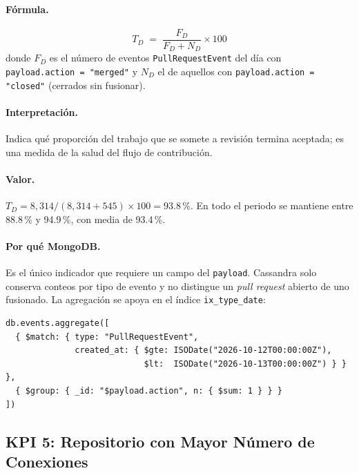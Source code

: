\paragraph{Fórmula.}
\[
T_D \;=\; \frac{F_D}{F_D + N_D} \times 100
\]
donde $F_D$ es el número de eventos \texttt{PullRequestEvent} del día con \texttt{payload.action = "merged"} y $N_D$ el de aquellos con \texttt{payload.action = "closed"} (cerrados sin fusionar).

\paragraph{Interpretación.} Indica qué proporción del trabajo que se somete a revisión termina aceptada; es una medida de la salud del flujo de contribución.

\paragraph{Valor.} $T_D = 8{,}314 / (8{,}314 + 545) \times 100 = 93.8$\,\%. En todo el periodo se mantiene entre 88.8\,\% y 94.9\,\%, con media de 93.4\,\%.

\paragraph{Por qué MongoDB.} Es el único indicador que requiere un campo del \texttt{payload}. Cassandra solo conserva conteos por tipo de evento y no distingue un \textit{pull request} abierto de uno fusionado. La agregación se apoya en el índice \texttt{ix\_type\_date}:

\begin{lstlisting}[style=plano]
db.events.aggregate([
  { $match: { type: "PullRequestEvent",
              created_at: { $gte: ISODate("2026-10-12T00:00:00Z"),
                            $lt:  ISODate("2026-10-13T00:00:00Z") } } },
  { $group: { _id: "$payload.action", n: { $sum: 1 } } }
])
\end{lstlisting}


\subsection{KPI 5: Repositorio con Mayor Número de Conexiones}

